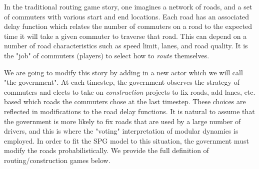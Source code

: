 
In the traditional routing game story, one imagines a network of roads, and a set of commuters with various start and end locations. Each road has an associated delay function which relates the number of commuters on a road to the expected time it will take a given commuter to traverse that road. This can depend on a number of road characteristics such as speed limit, lanes, and road quality. It is the "job" of commuters (players) to select how to {\em route} themselves.

We are going to modify this story by adding in a new actor which we will call "the government". At each timestep, the government observes the strategy of commuters and elects to take on {\em construction} projects to fix roads, add lanes, etc. based which roads the commuters chose at the last timestep. These choices are reflected in modifications to the road delay functions. It is natural to assume that the government is more likely to fix roads that are used by a large number of drivers, and this is where the "voting" interpretation of modular dynamics is employed. In order to fit the SPG model to this situation, the government must modify the roads probabilistically. We provide the full definition of routing/construction games below. 



